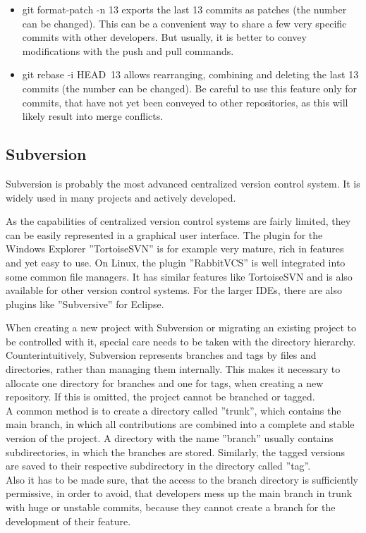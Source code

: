 \begin{itemize}
				\item {\normalfont \ttfamily git format-patch -n 13} exports the last 13 commits as patches (the number can be changed). This can be a convenient way to share a few very specific commits with other developers. But usually, it is better to convey modifications with the {\normalfont \ttfamily push} and {\normalfont \ttfamily pull} commands.
				\item {\normalfont \ttfamily git rebase -i HEAD~13} allows rearranging, combining and deleting the last 13 commits (the number can be changed). Be careful to use this feature only for commits, that have not yet been conveyed to other repositories, as this will likely result into merge conflicts.
			\end{itemize}

		\subsection{Subversion}
			Subversion is probably the most advanced centralized version control system.
			It is widely used in many projects and actively developed.

			As the capabilities of centralized version control systems are fairly limited, they can be easily represented in a graphical user interface.
			The plugin for the Windows Explorer ''TortoiseSVN'' is for example very mature, rich in features and yet easy to use.
			On Linux, the plugin ''RabbitVCS'' is well integrated into some common file managers.
			It has similar features like TortoiseSVN and is also available for other version control systems.
			For the larger IDEs, there are also plugins like ''Subversive'' for Eclipse.

			When creating a new project with Subversion or migrating an existing project to be controlled with it, special care needs to be taken with the directory hierarchy.
			Counterintuitively, Subversion represents branches and tags by files and directories, rather than managing them internally.
			This makes it necessary to allocate one directory for branches and one for tags, when creating a new repository.
			If this is omitted, the project cannot be branched or tagged.\\
			A common method is to create a directory called ''trunk'', which contains the main branch, in which all contributions are combined into a complete and stable version of the project.
			A directory with the name ''branch'' usually contains subdirectories, in which the branches are stored.
			Similarly, the tagged versions are saved to their respective subdirectory in the directory called ''tag''.\\
			Also it has to be made sure, that the access to the branch directory is sufficiently permissive, in order to avoid, that developers mess up the main branch in trunk with huge or unstable commits, because they cannot create a branch for the development of their feature.


